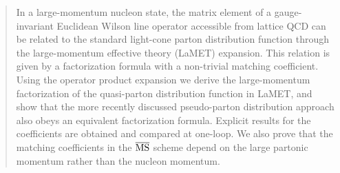 \documentclass[11pt]{article}
\begin{document}
\begin{abstract}
\noindent
In a large-momentum nucleon state, the matrix element of a gauge-invariant Euclidean Wilson line operator accessible from lattice QCD can be related to the standard light-cone parton distribution function through the large-momentum effective theory (LaMET) expansion. This relation is given by a factorization formula with a non-trivial matching coefficient.  Using the operator product expansion we derive the large-momentum factorization of the quasi-parton distribution function in LaMET, and show that the more recently discussed pseudo-parton distribution approach also obeys an equivalent factorization formula.  Explicit results for the coefficients are obtained and compared at one-loop.  We also prove that the matching coefficients in the $\overline{\rm MS}$ scheme depend on the large partonic momentum rather than the nucleon momentum.
\end{abstract}









\end{document}
